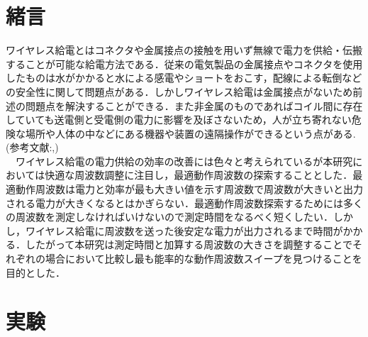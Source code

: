 \documentclass[10pt,a4paper,twocolumn]{jarticle}
\begin{document}


\section{緒言}
ワイヤレス給電とはコネクタや金属接点の接触を用いず無線で電力を供給・伝搬することが可能な給電方法である．従来の電気製品の金属接点やコネクタを使用したものは水がかかると水による感電やショートをおこす，配線による転倒などの安全性に関して問題点がある．しかしワイヤレス給電は金属接点がないため前述の問題点を解決することができる．また非金属のものであればコイル間に存在していても送電側と受電側の電力に影響を及ぼさないため，人が立ち寄れない危険な場所や人体の中などにある機器や装置の遠隔操作ができるという点がある.(参考文献:\cite{syourai},\cite{rohm1})
\\　ワイヤレス給電の電力供給の効率の改善には色々と考えられているが本研究においては快適な周波数調整に注目し，最適動作周波数の探索することとした．最適動作周波数は電力と効率が最も大きい値を示す周波数で周波数が大きいと出力される電力が大きくなるとはかぎらない．最適動作周波数探索するためには多くの周波数を測定しなければいけないので測定時間をなるべく短くしたい．しかし，ワイヤレス給電に周波数を送った後安定な電力が出力されるまで時間がかかる．したがって本研究は測定時間と加算する周波数の大きさを調整することでそれぞれの場合において比較し最も能率的な動作周波数スイープを見つけることを目的とした．
\section{実験}
\end{document}
